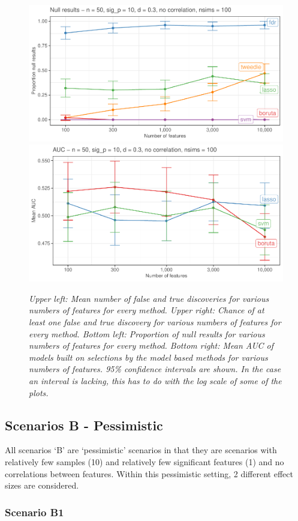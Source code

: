 \documentclass[
]{article}
\begin{document}
\begin{figure}

{\centering \includegraphics[width=0.49\linewidth]{main_files/figure-latex/A3-1} \includegraphics[width=0.49\linewidth]{main_files/figure-latex/A3-2} 

}

\caption{\textit{Upper left: Mean number of false and true discoveries for various numbers of features for every method. Upper right: Chance of at least one false and true discovery for various numbers of features for every method. Bottom left: Proportion of null results for various numbers of features for every method. Bottom right: Mean AUC of models built on selections by the model based methods for various numbers of features. 95\% confidence intervals are shown. In the case an interval is lacking, this has to do with the log scale of some of the plots.}}\label{fig:A3}
\end{figure}

\hypertarget{scenarios-b---pessimistic}{%
\subsection{Scenarios B - Pessimistic}\label{scenarios-b---pessimistic}}

All scenarios `B' are `pessimistic' scenarios in that they are scenarios with relatively few samples (10) and relatively few significant features (1) and no correlations between features. Within this pessimistic setting, 2 different effect sizes are considered.

\hypertarget{scenario-b1}{%
\subsubsection{Scenario B1}\label{scenario-b1}}
\end{document}
